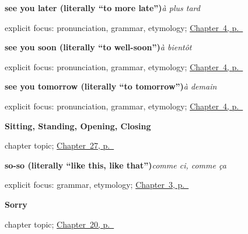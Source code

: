\noindent\begin{minipage}[t]{\linewidth}
\raggedright
\textbf{see you later (literally \textquotedblleft{}to more late\textquotedblright{})}\enspace\emph{à plus tard}\par
\footnotesize explicit focus: pronunciation, grammar, etymology; \hyperref[ch:farewells]{Chapter~4, p.~\pageref*{ch:farewells}}
\end{minipage}\par\smallskip

\noindent\begin{minipage}[t]{\linewidth}
\raggedright
\textbf{see you soon (literally \textquotedblleft{}to well-soon\textquotedblright{})}\enspace\emph{à bientôt}\par
\footnotesize explicit focus: pronunciation, grammar, etymology; \hyperref[ch:farewells]{Chapter~4, p.~\pageref*{ch:farewells}}
\end{minipage}\par\smallskip

\noindent\begin{minipage}[t]{\linewidth}
\raggedright
\textbf{see you tomorrow (literally \textquotedblleft{}to tomorrow\textquotedblright{})}\enspace\emph{à demain}\par
\footnotesize explicit focus: pronunciation, grammar, etymology; \hyperref[ch:farewells]{Chapter~4, p.~\pageref*{ch:farewells}}
\end{minipage}\par\smallskip

\noindent\begin{minipage}[t]{\linewidth}
\raggedright
\textbf{Sitting, Standing, Opening, Closing}\par
\footnotesize chapter topic; \hyperref[ch:fr-sitting-standing-opening-closing]{Chapter~27, p.~\pageref*{ch:fr-sitting-standing-opening-closing}}
\end{minipage}\par\smallskip

\noindent\begin{minipage}[t]{\linewidth}
\raggedright
\textbf{so-so (literally \textquotedblleft{}like this, like that\textquotedblright{})}\enspace\emph{comme ci, comme ça}\par
\footnotesize explicit focus: grammar, etymology; \hyperref[ch:how-are-you]{Chapter~3, p.~\pageref*{ch:how-are-you}}
\end{minipage}\par\smallskip

\noindent\begin{minipage}[t]{\linewidth}
\raggedright
\textbf{Sorry}\par
\footnotesize chapter topic; \hyperref[ch:fr-sorry]{Chapter~20, p.~\pageref*{ch:fr-sorry}}
\end{minipage}\par\smallskip

